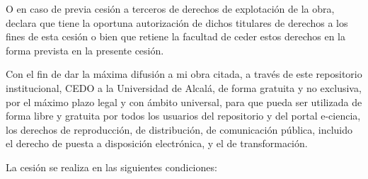 O en caso de previa cesión a terceros de derechos de explotación de la
obra, \mybookElOrLa{} \mybookAutorOrAutora{} declara que tiene la
oportuna autorización de dichos titulares de derechos a los fines de
esta cesión o bien que retiene la facultad de ceder estos derechos en la
forma prevista en la presente cesión.

Con el fin de dar la máxima difusión a mi obra citada, a través de este repositorio
institucional, CEDO a la Universidad de Alcalá, de forma gratuita y no exclusiva, por el
máximo plazo legal y con ámbito universal, para que pueda ser utilizada de forma libre y
gratuita por todos los usuarios del repositorio y del portal e-ciencia, los derechos de
reproducción, de distribución, de comunicación pública, incluido el derecho de puesta a
disposición electrónica, y el de transformación.

La cesión se realiza en las siguientes condiciones:

